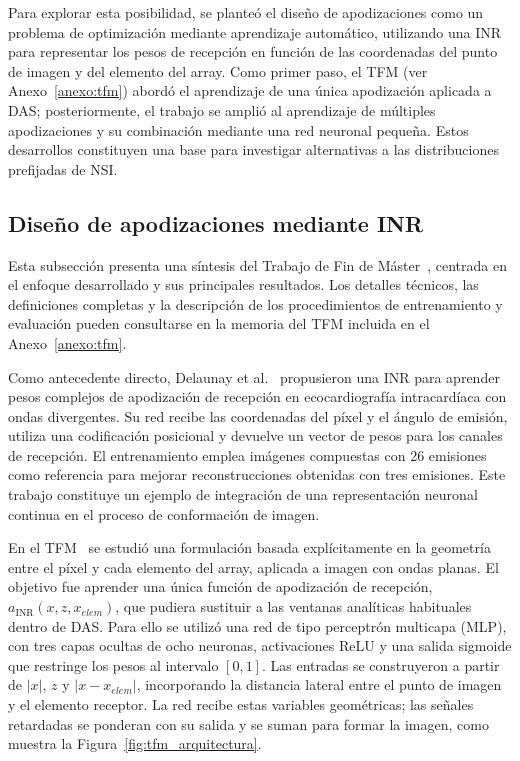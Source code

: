 \documentclass[10pt,a4paper]{article}
\begin{document}
Para explorar esta posibilidad, se planteó el diseño de apodizaciones como un problema de optimización mediante aprendizaje automático, utilizando una INR para representar los pesos de recepción en función de las coordenadas del punto de imagen y del elemento del array. Como primer paso, el TFM (ver Anexo~\ref{anexo:tfm}) abordó el aprendizaje de una única apodización aplicada a DAS; posteriormente, el trabajo se amplió al aprendizaje de múltiples apodizaciones y su combinación mediante una red neuronal pequeña. Estos desarrollos constituyen una base para investigar alternativas a las distribuciones prefijadas de NSI.

\subsection{Diseño de apodizaciones mediante INR}\label{sec:tfm}
Esta subsección presenta una síntesis del Trabajo de Fin de Máster~\cite{CosarinskyTFM2026}, centrada en el enfoque desarrollado y sus principales resultados. Los detalles técnicos, las definiciones completas y la descripción de los procedimientos de entrenamiento y evaluación pueden consultarse en la memoria del TFM incluida en el Anexo~\ref{anexo:tfm}.

Como antecedente directo, Delaunay et al.~\cite{Delaunay2025} propusieron una INR para aprender pesos complejos de apodización de recepción en ecocardiografía intracardíaca con ondas divergentes. Su red recibe las coordenadas del píxel y el ángulo de emisión, utiliza una codificación posicional y devuelve un vector de pesos para los canales de recepción. El entrenamiento emplea imágenes compuestas con 26 emisiones como referencia para mejorar reconstrucciones obtenidas con tres emisiones. Este trabajo constituye un ejemplo de integración de una representación neuronal continua en el proceso de conformación de imagen.

En el TFM~\cite{CosarinskyTFM2026} se estudió una formulación basada explícitamente en la geometría entre el píxel y cada elemento del array, aplicada a imagen con ondas planas. El objetivo fue aprender una única función de apodización de recepción, $a_{\mathrm{INR}}(x,z,x_{elem})$, que pudiera sustituir a las ventanas analíticas habituales dentro de DAS. Para ello se utilizó una red de tipo perceptrón multicapa (MLP), con tres capas ocultas de ocho neuronas, activaciones ReLU y una salida sigmoide que restringe los pesos al intervalo $[0,1]$. Las entradas se construyeron a partir de $|x|$, $z$ y $|x-x_{elem}|$, incorporando la distancia lateral entre el punto de imagen y el elemento receptor. La red recibe estas variables geométricas; las señales retardadas se ponderan con su salida y se suman para formar la imagen, como muestra la Figura~\ref{fig:tfm_arquitectura}.
\end{document}
